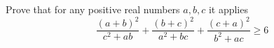 Prove that for any positive real numbers $a,b,c$ it applies
\[
\frac{(a+b)^2}{c^2 + ab} + \frac{(b+c)^2}{a^2 + bc} + \frac{(c+a)^2}{b^2 + ac} \geq 6
\]